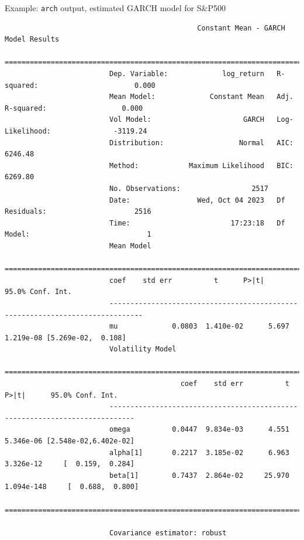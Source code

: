 \begin{frame}[fragile]
\begin{block}{Example: \texttt{arch} output, estimated GARCH model for S\&P500}
	\tiny
\begin{verbatim}
                                              Constant Mean - GARCH Model Results                      
                         ==============================================================================
                         Dep. Variable:             log_return   R-squared:                       0.000
                         Mean Model:             Constant Mean   Adj. R-squared:                  0.000
                         Vol Model:                      GARCH   Log-Likelihood:               -3119.24
                         Distribution:                  Normal   AIC:                           6246.48
                         Method:            Maximum Likelihood   BIC:                           6269.80
                         No. Observations:                 2517
                         Date:                Wed, Oct 04 2023   Df Residuals:                     2516
                         Time:                        17:23:18   Df Model:                            1
                         Mean Model                                
                         ==============================================================================
                         coef    std err          t      P>|t|    95.0% Conf. Int.
                         ------------------------------------------------------------------------------
                         mu             0.0803  1.410e-02      5.697  1.219e-08 [5.269e-02,  0.108]
                         Volatility Model                              
                         ==============================================================================
                                          coef    std err          t      P>|t|      95.0% Conf. Int.
                         ----------------------------------------------------------------------------
                         omega          0.0447  9.834e-03      4.551  5.346e-06 [2.548e-02,6.402e-02]
                         alpha[1]       0.2217  3.185e-02      6.963  3.326e-12     [  0.159,  0.284]
                         beta[1]        0.7437  2.864e-02     25.970 1.094e-148     [  0.688,  0.800]
                         ==============================================================================

                         Covariance estimator: robust
\end{verbatim}
\end{block}
\end{frame}


